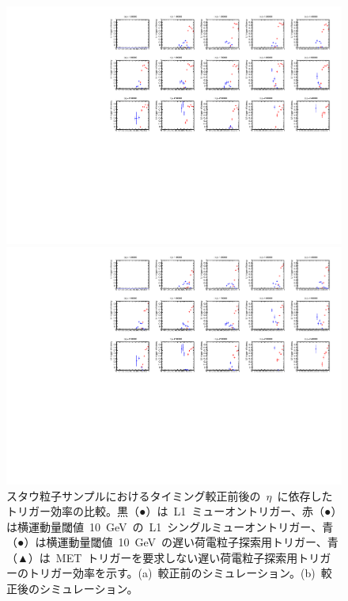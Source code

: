 \begin{figure}[H]
    \begin{minipage}{0.49\hsize}
    \centering   
    \includegraphics[width=\textwidth,page=9]{img/rec/stau_600_ori.pdf}
    \subcaption{}
    \end{minipage}
    \begin{minipage}{0.49\hsize}
    \centering   
    \includegraphics[width=\textwidth,page=9]{img/rec/stau_600.pdf}
    \subcaption{}
    \end{minipage}
    \caption[スタウ粒子サンプルにおけるタイミング較正前後の~$\eta$~に依存したトリガー効率の比較]{スタウ粒子サンプルにおけるタイミング較正前後の~$\eta$~に依存したトリガー効率の比較。黒（●）は~L1~ミューオントリガー、赤（●）は横運動量閾値~10~GeV~の~L1~シングルミューオントリガー、青（●）は横運動量閾値~10~GeV~の遅い荷電粒子探索用トリガー、青（▲）は~MET~トリガーを要求しない遅い荷電粒子探索用トリガーのトリガー効率を示す。(a)~較正前のシミュレーション。(b)~較正後のシミュレーション。}\label{fig:trieta}
\end{figure}

